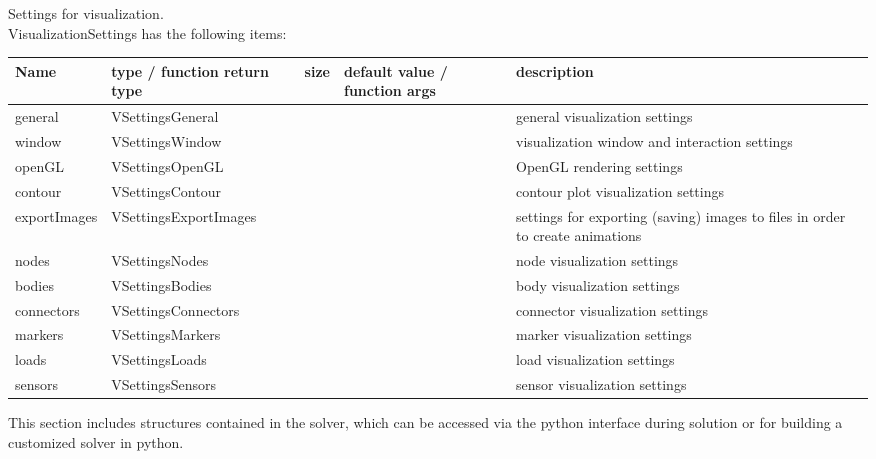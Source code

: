 \label{sec_VisualizationSettings}
Settings for visualization. \\ 
%
VisualizationSettings has the following items:
\begin{center}
  \footnotesize
  \begin{longtable}{| p{4.2cm} | p{2.5cm} | p{0.3cm} | p{3.0cm} | p{6cm} |}
    \hline
    \bf Name & \bf type / function return type & \bf size & \bf default value / function args & \bf description \\ \hline
    general &     VSettingsGeneral &      &      &     general visualization settings\\ \hline
    window &     VSettingsWindow &      &      &     visualization window and interaction settings\\ \hline
    openGL &     VSettingsOpenGL &      &      &     OpenGL rendering settings\\ \hline
    contour &     VSettingsContour &      &      &     contour plot visualization settings\\ \hline
    exportImages &     VSettingsExportImages &      &      &     settings for exporting (saving) images to files in order to create animations\\ \hline
    nodes &     VSettingsNodes &      &      &     node visualization settings\\ \hline
    bodies &     VSettingsBodies &      &      &     body visualization settings\\ \hline
    connectors &     VSettingsConnectors &      &      &     connector visualization settings\\ \hline
    markers &     VSettingsMarkers &      &      &     marker visualization settings\\ \hline
    loads &     VSettingsLoads &      &      &     load visualization settings\\ \hline
    sensors &     VSettingsSensors &      &      &     sensor visualization settings\\ \hline
	  \end{longtable}
	\end{center}

This section includes structures contained in the solver, which can be accessed via the python interface during solution or for building a customized solver in python.

